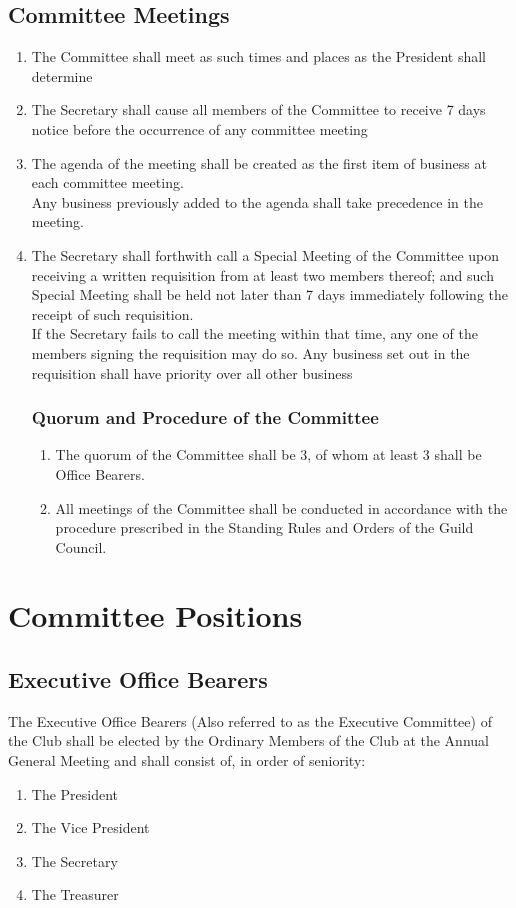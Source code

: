 \documentclass[10pt,a4paper]{report}
\begin{document}
	\section{Committee Meetings}
	\begin{enumerate}[label=\alph*]
		\item The Committee shall meet as such times and places as the President shall determine
		\item The Secretary shall cause all members of the Committee to receive 7 days notice before the occurrence of any committee meeting
		\item The agenda of the meeting shall be created as the first item of business at each committee meeting. \\
		Any business previously added to the agenda shall take precedence in the meeting.
		\item The Secretary shall forthwith call a Special Meeting of the Committee upon receiving a written requisition from at least two members thereof; and such Special Meeting shall be held not later than 7 days immediately following the receipt of such requisition. \\
		If the Secretary fails to call the meeting within that time, any one of the members signing the requisition may do so. Any business set out in the requisition shall have priority over all other business
		\subsection{Quorum and Procedure of the Committee}
		\begin{enumerate}[label=\alph*]
		\item The quorum of the Committee shall be 3, of whom at least 3 shall be Office Bearers.
		\item All meetings of the Committee shall be conducted in accordance with the procedure prescribed in the Standing Rules and Orders of the Guild Council. 
		\end{enumerate}
	\end{enumerate}

	\chapter{Committee Positions}
	\section{Executive Office Bearers}
	The Executive Office Bearers (Also referred to as the Executive Committee) of the Club shall be elected by the Ordinary Members of the Club at the Annual General Meeting and shall consist of, in order of seniority:
		\begin{enumerate}[label=\alph*]
			\item The President
			\item The Vice President
			\item The Secretary
			\item The Treasurer
		\end{enumerate}
\end{document}
